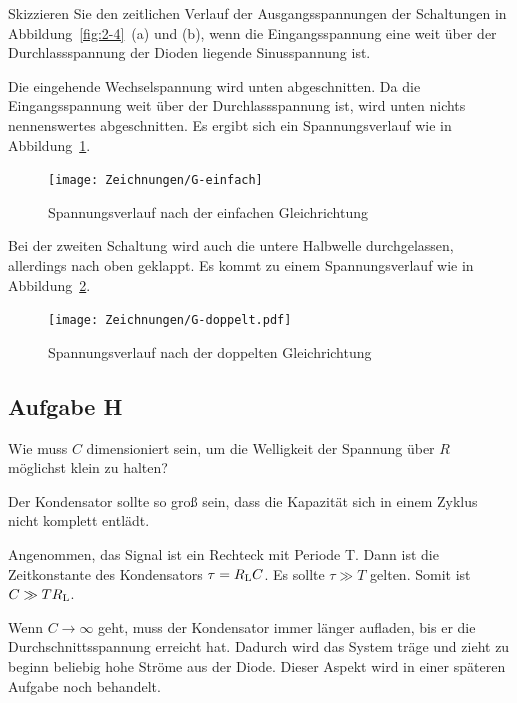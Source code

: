 \begin{problem}
	Skizzieren Sie den zeitlichen Verlauf der Ausgangsspannungen der
	Schaltungen in Abbildung~\ref{fig:2-4}~(a) und (b), wenn die
	Eingangsspannung eine weit über der Durchlassspannung der Dioden liegende
	Sinusspannung ist.
\end{problem}

Die eingehende Wechselspannung wird unten abgeschnitten. Da die
Eingangsspannung weit über der Durchlassspannung ist, wird unten nichts
nennenswertes abgeschnitten. Es ergibt sich ein Spannungsverlauf wie in
Abbildung~\ref{fig:G-einfach}.

\begin{figure}[htbp]
	\centering
	\texttt{[image: Zeichnungen/G-einfach]}
	\caption{%
		Spannungsverlauf nach der einfachen Gleichrichtung
	}
	\label{fig:G-einfach}
\end{figure}

Bei der zweiten Schaltung wird auch die untere Halbwelle durchgelassen,
allerdings nach oben geklappt. Es kommt zu einem Spannungsverlauf wie in
Abbildung~\ref{fig:G-doppelt}.

\begin{figure}[htbp]
	\centering
	\texttt{[image: Zeichnungen/G-doppelt.pdf]}
	\caption{%
		Spannungsverlauf nach der doppelten Gleichrichtung
	}
	\label{fig:G-doppelt}
\end{figure}

\FloatBarrier
\subsection{Aufgabe H}

\begin{problem}
	Wie muss $C$ dimensioniert sein, um die Welligkeit der Spannung über $R$
	möglichst klein zu halten?
\end{problem}

Der Kondensator sollte so groß sein, dass die Kapazität sich in einem Zyklus
nicht komplett entlädt.

Angenommen, das Signal ist ein Rechteck mit Periode T. Dann ist die
Zeitkonstante des Kondensators $\tau = R_\text L C$. Es sollte $\tau \gg T$
gelten. Somit ist $C \gg T R_\text L$.

Wenn $C \to \infty$ geht, muss der Kondensator immer länger aufladen, bis er
die Durchschnittsspannung erreicht hat. Dadurch wird das System träge und zieht
zu beginn beliebig hohe Ströme aus der Diode. Dieser Aspekt wird in einer
späteren Aufgabe noch behandelt.

